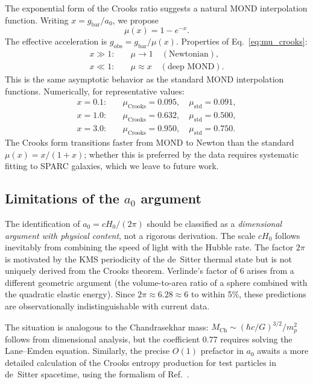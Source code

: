\documentclass[prd,twocolumn,superscriptaddress,longbibliography,floatfix]{revtex4-2}
\begin{document}
The exponential form of the Crooks ratio suggests a natural
MOND interpolation function.  Writing $x = g_{\mathrm{bar}}/a_0$,
we propose
\begin{equation}
\mu(x) = 1 - e^{-x}.
\label{eq:mu_crooks}
\end{equation}
The effective acceleration is
$g_{\mathrm{obs}} = g_{\mathrm{bar}}/\mu(x)$.
Properties of Eq.~\eqref{eq:mu_crooks}:
\begin{align}
x \gg 1:&\quad \mu \to 1 \quad (\text{Newtonian}),
\nonumber\\
x \ll 1:&\quad \mu \approx x \quad (\text{deep MOND}).
\nonumber
\end{align}
This is the same asymptotic behavior as the standard MOND
interpolation functions.  Numerically, for representative
values:
\begin{align}
x = 0.1:&\quad \mu_{\mathrm{Crooks}} = 0.095,\quad
\mu_{\mathrm{std}} = 0.091,
\nonumber\\
x = 1.0:&\quad \mu_{\mathrm{Crooks}} = 0.632,\quad
\mu_{\mathrm{std}} = 0.500,
\nonumber\\
x = 3.0:&\quad \mu_{\mathrm{Crooks}} = 0.950,\quad
\mu_{\mathrm{std}} = 0.750.
\nonumber
\end{align}
The Crooks form transitions faster from MOND to Newton than
the standard $\mu(x) = x/(1+x)$; whether this is preferred by
the data requires systematic fitting to SPARC galaxies, which
we leave to future work.

\subsection{Limitations of the $a_0$ argument}

The identification of $a_0 = cH_0/(2\pi)$ should be classified as
a \emph{dimensional argument with physical content}, not a
rigorous derivation.  The scale $cH_0$ follows inevitably from
combining the speed of light with the Hubble rate.  The factor
$2\pi$ is motivated by the KMS periodicity of the de~Sitter
thermal state but is not uniquely derived from the Crooks
theorem.  Verlinde's factor of 6 arises from a different
geometric argument (the volume-to-area ratio of a sphere
combined with the quadratic elastic energy).  Since
$2\pi \approx 6.28 \approx 6$ to within 5\%, these
predictions are observationally indistinguishable with current
data.

The situation is analogous to the Chandrasekhar mass:
$M_{\mathrm{Ch}} \sim (\hbar c/G)^{3/2}/m_p^2$ follows from
dimensional analysis, but the coefficient 0.77 requires
solving the Lane--Emden equation.  Similarly, the precise
$O(1)$ prefactor in $a_0$ awaits a more detailed calculation
of the Crooks entropy production for test particles in
de~Sitter spacetime, using the formalism of
Ref.~\cite{BassoCeleri2025}.
\end{document}
